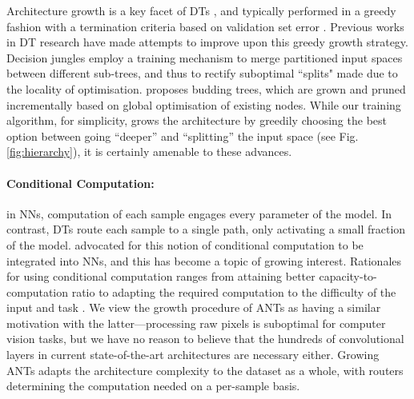 Architecture growth is a key facet of DTs \cite{criminisi2013decision}, and typically performed in a greedy fashion with a termination criteria based on validation set error \cite{suarez1999globally,irsoy2012soft}. Previous works in DT research have made attempts to improve upon this greedy growth strategy. Decision jungles \cite{shotton2013decision} employ a training mechanism to merge partitioned input spaces between different sub-trees, and thus to rectify suboptimal ``splits" made due to the locality of optimisation. \cite{irsoy2014budding} proposes budding trees, which are grown and pruned incrementally based on global optimisation of existing nodes. While our training algorithm, for simplicity, grows the architecture by
greedily choosing the best option between going “deeper” and “splitting” the input space (see Fig. \ref{fig:hierarchy}), it is certainly amenable to these advances. 


\paragraph{Conditional Computation:} in NNs, computation of each sample engages every parameter of the model. In contrast, DTs route each sample to a single path, only activating a small fraction of the model. \cite{bengio2013deep} advocated for this notion of conditional computation to be integrated into NNs, and this has become a topic of growing interest. Rationales for using conditional computation ranges from attaining better capacity-to-computation ratio \cite{bengio2013estimating,davis2013low,bengio2015conditional,Shazeer2017OutrageouslyLN} to adapting the required computation to the difficulty of the input and task \cite{bengio2015conditional,almahairi2016dynamic,Teerapittayanon2016BranchyNetFI,Graves2016AdaptiveCT,Figurnov2017SpatiallyAC,veit2017convolutional}. We view the growth procedure of ANTs as having a similar motivation with the latter---processing raw pixels is suboptimal for computer vision tasks, but we have no reason to believe that the hundreds of convolutional layers in current state-of-the-art architectures \cite{he2016deep,huang2017densely} are necessary either. Growing ANTs adapts the architecture complexity to the dataset as a whole, with routers determining the computation needed on a per-sample basis. 

